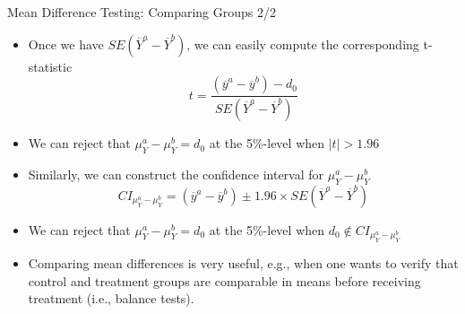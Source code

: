 \documentclass[notes,10pt, aspectratio=169]{beamer}
\begin{document}
\begin{frame}{Mean Difference Testing: Comparing Groups 2/2}
\begin{itemize}
    \item Once we have $SE(\overline{Y}^a-\overline{Y}^b)$, we can easily compute the corresponding t-statistic
    \begin{equation*}
        t = \frac{(\overline{y}^a - \overline{y}^b) - d_0}{SE(\overline{Y}^a-\overline{Y}^b)}
    \end{equation*}
    \item[$\rightarrow$] We can reject that $\mu_Y^a - \mu_Y^b = d_0$ at the 5\%-level when $\mid t \mid > 1.96$ \vspace{.5cm}
    \item Similarly, we can construct the confidence interval for $\mu_Y^a - \mu_Y^b$
    \begin{equation*}
        CI_{\mu_Y^a - \mu_Y^b} = (\overline{y}^a -\overline{y}^b)\pm1.96\times SE(\overline{Y}^a-\overline{Y}^b)
    \end{equation*}
    \item[$\rightarrow$] We can reject that $\mu_Y^a - \mu_Y^b = d_0$ at the 5\%-level when $d_0\notin CI_{\mu_Y^a - \mu_Y^b}$\vspace{.5cm}
    \item Comparing mean differences is very useful, e.g., when one wants to verify that control and treatment groups are comparable in means before receiving treatment (i.e., balance tests).
\end{itemize}
\end{frame}
\end{document}
